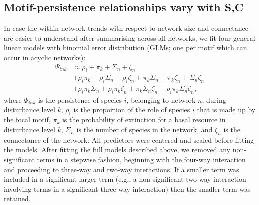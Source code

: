 \documentclass[12pt]{article}
\begin{document}
\begin{spacing}{2.0}
\clearpage

\section{Motif-persistence relationships vary with S,C}

    In case the within-network trends with respect to network size and connectance are easier to understand after summarising across all networks, we fit four general linear models with binomial error distribution (GLMs; one per motif which can occur in acyclic networks): 
             \begin{equation}
             \begin{aligned}
            \Psi_{ink} & \approx \rho_{i} + \pi_{k} + \Sigma_{n} + \zeta_{n} \\
            & + \rho_{i}\pi_{k} + \rho_{i}\Sigma_{n} + \rho_{i}\zeta_{n} + \pi_{k}\Sigma_{n} + \pi_{k}\zeta_{n} + \Sigma_{n}\zeta_{n} \\
            & + \rho_{i}\pi_{k}\Sigma_{n} + \rho_{i}\pi_{k}\zeta_{n} + \pi_{k}\Sigma_{n}\zeta_{n} + \rho_{i}\pi_{k}\Sigma_{n}\zeta_{n} ,
            \label{propreq}
            \end{aligned}
            \end{equation}
            \noindent where $\Psi_{ink}$ is the persistence of species $i$, belonging to network $n$, during disturbance level $k$, $\rho_{i}$ is the proportion of the role of species $i$ that is made up by the focal motif, $\pi_k$ is the probability of extinction for a basal resource in disturbance level $k$, $\Sigma_{n}$ is the number of species in the network, and $\zeta_{n}$ is the connectance of the network.
            All predictors were centered and scaled before fitting the models.    
            After fitting the full models described above, we removed any non-significant terms in a stepwise fashion, beginning with the four-way interaction and proceeding to three-way and two-way interactions.
            If a smaller term was included in a significant larger term (e.g., a non-significant two-way interaction involving terms in a significant three-way interaction) then the smaller term was retained.



\end{spacing}
\end{document}
